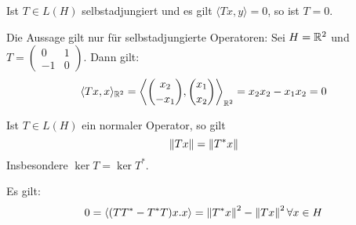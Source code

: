 \newpage
\begin{korollar}
	Ist $ T\in L(H) $ selbstadjungiert und es gilt $ \langle Tx,y\rangle=0 $, so ist $ T=0 $.
\end{korollar}
\begin{bemerkung*}
	Die Aussage gilt nur f\"ur selbstadjungierte Operatoren: Sei $ H=\mathbb{R}^2 $ und $ T=\left(\begin{smallmatrix}
	0&1\\-1&0
	\end{smallmatrix}\right) $. Dann gilt:
	\[ \langle Tx,x\rangle_{\mathbb{R}^2}=\left\langle\binom{x_2}{-x_1},\binom{x_1}{x_2}\right\rangle_{\mathbb{R}^2}=x_2x_2-x_1x_2=0 \]
\end{bemerkung*}
\begin{lemma}
	Ist $ T\in L(H) $ ein normaler Operator, so gilt
	\[ \left\|Tx\right\|=\left\|T^\ast x\right\| \]
	Insbesondere $ \ker T=\ker T^\ast $.
\end{lemma}
\begin{beweis}
	Es gilt:
	\[ 0=\langle (TT^\ast-T^\ast T)x.x\rangle=\left\|T^\ast x\right\|^2-\left\|Tx\right\|^2\forall x\in H \]
\end{beweis}